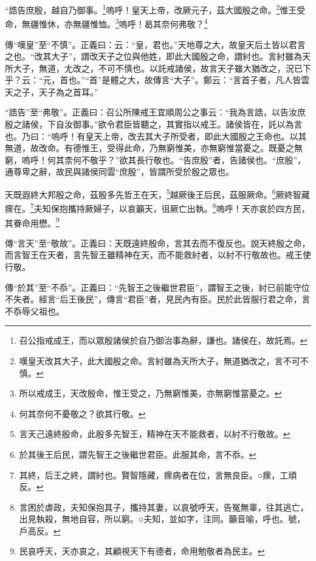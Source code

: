 “誥告庶殷，越自乃御事。\footnote{召公指戒成王，而以眾殷諸侯於自乃御治事為辭，謙也。諸侯在，故託焉。}嗚呼！皇天上帝，改厥元子，茲大國殷之命。\footnote{嘆皇天改其大子，此大國殷之命。言紂雖為天所大子，無道猶改之，言不可不慎。}惟王受命，無疆惟休，亦無疆惟恤。\footnote{所以戒成王，天改殷命，惟王受之，乃無窮惟美，亦無窮惟當憂之。}嗚呼！曷其奈何弗敬？\footnote{何其奈何不憂敬之？欲其行敬。}


{\noindent\zhuan{}\fzbyks 傳“嘆皇”至“不慎”。正義曰：云：“皇，君也。”天地尊之大，故皇天后土皆以君言之也。“改其大子”，謂改天子之位與他姓，即此大國殷之命，謂紂也。言紂雖為天所大子，無道，尢改之，不可不慎也。以託戒諸侯，故言天子雖大猶改之，況已下乎？云：“元，首也。”“首”是體之大，故傳言“大子”。鄭云：“言首子者，凡人皆雲天之子，天子為之首耳。” \par}

{\noindent\shu{}\fzkt “誥告”至“弗敬”。正義曰：召公所陳戒王宜順周公之事云：“我為言誥，以告汝庶殷之諸侯，下自汝御事。”欲令君臣皆聽之，其實指以戒王。諸侯皆在，託以為言也。乃曰：“嗚呼！有皇天上帝，改去其大子所受者，即此大國殷之王命也。以其無道，故改命。有德惟王，受得此命，乃無窮惟美，亦無窮惟當憂之。既憂之無窮，嗚呼！何其柰何不敬乎？”欲其長行敬也。“告庶殷”者，告諸侯也。“庶殷”，通尊卑之辭，故民與諸侯同雲“庶殷”，皆謂所受於殷之眾也。 \par}

天既遐終大邦殷之命，茲殷多先哲王在天，\footnote{言天己遠終殷命，此殷多先智王，精神在天不能救者，以紂不行敬故。}越厥後王后民，茲服厥命。\footnote{於其後王后民，謂先智王之後繼世君臣。此服其命，言不忝。}厥終智藏瘝在。\footnote{其終，后王之終，謂紂也。賢智隱藏，瘝病者在位，言無良臣。○瘝，工頑反。}夫知保抱攜持厥婦子，以哀籲天，徂厥亡出執。\footnote{言困於虐政，夫知保抱其子，攜持其妻，以哀號呼天，告冤無辜，往其逃亡，出見執殺，無地自容，所以窮。○夫知，並如字，注同。籲音喻，呼也。號，戶高反。}嗚呼！天亦哀於四方民，其眷命用懋。\footnote{民哀呼天，天亦哀之，其顧視天下有德者，命用勉敬者為民主。}


{\noindent\zhuan{}\fzbyks 傳“言天”至“敬故”。正義曰：天既遠終殷命，言其去而不復反也。說天終殷之命，而言智王在天者，言先智王雖精神在天，而不能救紂者，以紂不行敬故也。戒王使行敬。 \par}

{\noindent\zhuan{}\fzbyks 傳“於其”至“不忝”。正義曰：“先智王之後繼世君臣”，謂智王之後，紂已前能守位不失者。經言“后王後民”，傳言“君臣”者，見民內有臣。民於此皆服行君之命，言不忝辱父祖也。 \par}

